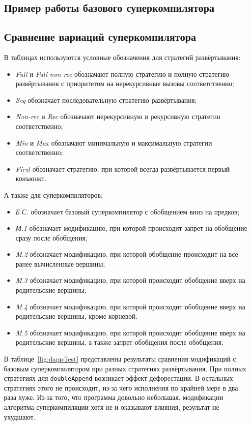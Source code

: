 \subsection{Пример работы базового суперкомпилятора \ukanren}


\subsection{Сравнение вариаций суперкомпилятора \ukanren}

В таблицах используются условные обозначения для стратегий развёртывания:
\begin{itemize}
\item {\it Full} и {\it Full-non-rec} обозначают полную стратегию и полную стратегию развёртывания с приоритетом на нерекурсивные вызовы соответственно;
\item {\it Seq} обозначает последовательную стратегию развёртывания;
\item {\it Non-rec} и {\it Rec} обозначают нерекурсивную и рекурсивную стратегии соответственно;
\item {\it Min} и {\it Max} обозначают минимальную и максимальную стратегии соответственно;
\item {\it First} обозначает стратегию, при которой всегда развёртывается первый конъюнкт.
\end{itemize}

А также для суперкомпиляторов:
\begin{itemize}
\item {\it Б.С.} обозначает базовый суперкомпилятор с обобщением вниз на предков;
\item {\it М.1 } обозначает модификацию, при которой происходит запрет на обобщение сразу после обобщения;
\item {\it M.2 } обозначает модификацию, при которой обобщение происходит на все ранее вычисленные вершины;
\item {\it M.3 } обозначает модификацию, при которой происходит обобщение вверх на родительские вершины;
\item {\it M.4 } обозначает модификацию, при которой происходит обобщение вверх на родительские вершины, кроме корневой.
\item {\it M.5 } обозначает модификацию, при которой происходит обобщение вверх на родительские вершины, а также запрет обобщения после обобщения.
\end{itemize}


В таблице~\ref{fig:dappTest} представлены результаты сравнения модификаций
с базовым суперкомпилятором при разных стратегиях развёртывания.
При полных стратегиях для \lstinline{doubleAppend} возникает эффект дефорестации.
В остальных стратегиях этого не происходит, из-за чего исполнения по
крайней мере в два раза хуже. Из-за того, что программа довольно небольшая,
модификации алгоритма суперкомпиляции хотя не и оказывают влияния, результат не ухудшают.


